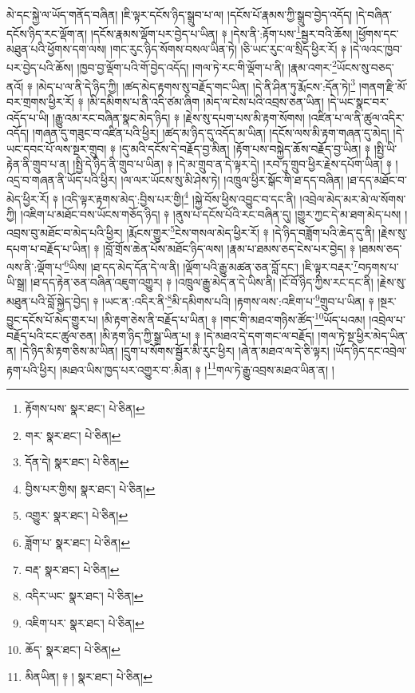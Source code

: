 མེ་དང་སྐྱེ་ལ་ཡོད་གནོད་བཞིན། །ཇི་ལྟར་དངོས་ཉིད་སྒྲུབ་པ་ལ། །དངོས་པོ་རྣམས་ཀྱི་སྒྲུབ་བྱེད་འདོད། །དེ་བཞིན་དངོས་ཉིད་རང་ལྡོག་ན། །དངོས་རྣམས་ལྡོག་པར་བྱེད་པ་ཡིན། ༈ །དེས་ནི་:རྟོག་པས་\footnote{རྟོགས་པས་  སྣར་ཐང་།  པེ་ཅིན། }སྦྱར་བའི་ཆོས། །ཕྱོགས་དང་མཐུན་པའི་ཕྱོགས་དག་ལས། །གང་རུང་ཉིད་སོགས་བསལ་ཡིན་ཏེ། །ཅི་ཡང་རུང་ལ་སྲིད་ཕྱིར་རོ། ༈ །དེ་ལའང་ཁྱབ་པར་བྱེད་པའི་ཆོས། །ཁྱབ་བྱ་ལྡོག་པའི་གོ་བྱེད་འདོད། །གལ་ཏེ་རང་གི་ལྡོག་པ་ནི། །རྣམ་འགར་\footnote{གར་  སྣར་ཐང་།  པེ་ཅིན། }ཡོངས་སུ་བཅད་ནའོ། ༈ །མེད་པ་ལ་ནི་དེ་ཉིད་ཀྱི། །ཚད་མེད་རྟགས་སུ་བརྗོད་གང་ཡིན། །དེ་ནི་ཤིན་ཏུ་རྨོངས་:དོན་ཏེ།\footnote{དོན་དེ།  སྣར་ཐང་།  པེ་ཅིན། } །གནག་རྫི་མོ་བར་གྲགས་ཕྱིར་རོ། ༈ །མི་དམིགས་པ་ནི་འདི་ཙམ་ཞིག །མེད་ལ་ངེས་པའི་འབྲས་ཅན་ཡིན། །དེ་ཡང་སྣང་བར་འདོད་པ་ཡི། །རྒྱུ་འམ་རང་བཞིན་སྣང་མེད་ཉིད། ༈ །རྗེས་སུ་དཔག་པས་མི་རྟག་སོགས། །འཛིན་པ་ལ་ནི་ཚུལ་འདིར་འདོད། །གཞན་དུ་གཟུང་བ་འཛིན་པའི་ཕྱིར། །ཚད་མ་ཉིད་དུ་འདོད་མ་ཡིན། །དངོས་ལས་མི་རྟག་གཞན་དུ་མེད། །དེ་ཡང་དབང་པོ་ལས་སྔར་གྲུབ། ༈ །དུ་མའི་དངོས་དེ་བརྗོད་བྱ་མིན། །རྟོག་པས་བསྐྱེད་ཆོས་བརྗོད་བྱ་ཡིན། ༈ །སྤྱི་ཡི་རྟེན་ནི་གྲུབ་པ་ན། །སྤྱི་དེ་ཉིད་ནི་གྲུབ་པ་ཡིན། ༈ །དེ་མ་གྲུབ་ན་དེ་ལྟར་དེ། །རབ་ཏུ་གྲུབ་ཕྱིར་རྗེས་དཔོག་ཡིན། ༈ །འདྲ་བ་གཞན་ནི་ཡོད་པའི་ཕྱིར། །ལ་ལར་ཡོངས་སུ་མི་ཤེས་ཏེ། །འཁྲུལ་ཕྱིར་སྒོང་གི་ཐ་དད་བཞིན། །ཐ་དད་མཐོང་བ་མེད་ཕྱིར་རོ། ༈ །འདི་ལྟར་རྟགས་མེད་:བྱིས་པར་གྱི།\footnote{བྱིས་པར་གྱིས།  སྣར་ཐང་།  པེ་ཅིན། } །སྐྱེ་བོས་ཕྱིས་འབྱུང་བ་དང་ནི། །འབྲེལ་མེད་མར་མེ་ལ་སོགས་ཀྱི། །འཇིག་པ་མཐོང་བས་ཡོངས་གཅོད་ཉིད། ༈ །ནུས་པ་དངོས་པོའི་རང་བཞིན་དུ། །གྱུར་ཀྱང་དེ་མ་ཐག་མེད་པས། །འབྲས་བུ་མཐོང་བ་མེད་པའི་ཕྱིར། །རྨོངས་གྱུར་\footnote{འགྱུར་  སྣར་ཐང་།  པེ་ཅིན། }ངེས་གསལ་མེད་ཕྱིར་རོ། ༈ །དེ་ཉིད་བཟློག་པའི་ཆེད་དུ་ནི། །རྗེས་སུ་དཔག་པ་བརྗོད་པ་ཡིན། ༈ །བློ་གྲོས་ཆེན་པོས་མཐོང་ཉིད་ལས། །རྣམ་པ་ཐམས་ཅད་ངེས་པར་བྱེད། ༈ །ཐམས་ཅད་ལས་ནི་:ལྡོག་པ་\footnote{ཟློག་པ་  སྣར་ཐང་།  པེ་ཅིན། }ཡིས། །ཐ་དད་མེད་དོན་དེ་ལ་ནི། །ལྡོག་པའི་རྒྱུ་མཚན་ཅན་བློ་དང་། །ཇི་ལྟར་བརྡར་\footnote{བརྡ་  སྣར་ཐང་།  པེ་ཅིན། }བཏགས་པ་ཡི་སྒྲ། །ཐ་དད་རྟེན་ཅན་བཞིན་འཇུག་འགྱུར། ༈ །འཁྲུལ་རྒྱུ་མེད་ན་དེ་ཡིས་ནི། །ངོ་བོ་ཉིད་ཀྱིས་རང་དང་ནི། །རྗེས་སུ་མཐུན་པའི་བློ་སྐྱེད་བྱེད། ༈ །ཡང་ན་:འདིར་ནི་\footnote{འདིར་ཡང་  སྣར་ཐང་།  པེ་ཅིན། }མི་དམིགས་པའི། །རྟགས་ལས་:འཇིག་པ་\footnote{འཇིག་པར་  སྣར་ཐང་།  པེ་ཅིན། }གྲུབ་པ་ཡིན། ༈ །སྔར་བྱུང་དངོས་པོ་མེད་གྱུར་པ། །མི་རྟག་ཅེས་ནི་བརྗོད་པ་ཡིན། ༈ །གང་གི་མཐའ་གཉིས་ཚོད་\footnote{ཆོད་  སྣར་ཐང་།  པེ་ཅིན། }ཡོད་པའམ། །འབྲེལ་པ་བརྗོད་པའི་ངང་ཚུལ་ཅན། །མི་རྟག་ཉིད་ཀྱི་སྒྲ་ཡིན་པ། ༈ །དེ་མཐའ་དེ་དག་གང་ལ་བརྗོད། །གལ་ཏེ་སྔ་ཕྱིར་མེད་ཡིན་ན། །དེ་ཉིད་མི་རྟག་ཅིས་མ་ཡིན། །དྲུག་པ་སོགས་སྦྱོར་མི་རུང་ཕྱིར། །ཞེ་ན་མཐའ་ལ་དེ་ཅི་ལྟར། །ཡོད་ཉིད་དང་འབྲེལ་རྟག་པའི་ཕྱིར། །མཐའ་ཡིས་ཁྱད་པར་འགྱུར་བ་:མིན། ༈ །\footnote{མིནཡིན། ༈ །  སྣར་ཐང་།  པེ་ཅིན། }གལ་ཏེ་རྒྱུ་འབྲས་མཐའ་ཡིན་ན། །
